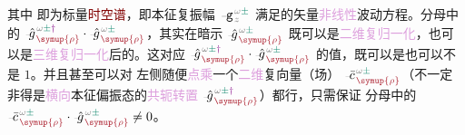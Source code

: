 其中  即为标量\textcolor{Maroon}{时空谱}，即\textcolor{PineGreen}{本征复振幅} $\Xint{\begin{smallmatrix} ~ \\ {}^{}_{\mathcolor{gray}{-}} \\ ~ \end{smallmatrix}}{09}{\mathtt{g}}^{\;\!\mathcolor{gray}{\omega} \textcolor{PineGreen}{\pm}}_{\;\! \mathcolor{gray}{z}}$ 满足的矢量\textcolor{Plum}{非线性}波动方程。分母中的 $\Xint{{}^{}_{\mathcolor{gray}{-}}}{10}{\hat{g}}^{\;\!\mathcolor{gray}{\omega} \textcolor{PineGreen}{\pm} \textcolor{Plum}{\dag}}_{\;\! \textcolor{Maroon}{\symup{\rho}}} \cdot \Xint{{}^{}_{\mathcolor{gray}{-}}}{10}{\hat{g}}^{\;\!\mathcolor{gray}{\omega} \textcolor{PineGreen}{\pm}}_{\;\! \textcolor{Maroon}{\symup{\rho}}}$，其实在暗示 $\Xint{{}^{}_{\mathcolor{gray}{-}}}{10}{\hat{g}}^{\;\!\mathcolor{gray}{\omega} \textcolor{PineGreen}{\pm}}_{\;\! \textcolor{Maroon}{\symup{\rho}}}$ 既可以是\textcolor{Plum}{二维复归一化}，也可以是\textcolor{Plum}{三维复归一化}后的。这对应 $\Xint{{}^{}_{\mathcolor{gray}{-}}}{10}{\hat{g}}^{\;\!\mathcolor{gray}{\omega} \textcolor{PineGreen}{\pm} \textcolor{Plum}{\dag}}_{\;\! \textcolor{Maroon}{\symup{\rho}}} \cdot \Xint{{}^{}_{\mathcolor{gray}{-}}}{10}{\hat{g}}^{\;\!\mathcolor{gray}{\omega} \textcolor{PineGreen}{\pm}}_{\;\! \textcolor{Maroon}{\symup{\rho}}}$ 的值，既可以是也可以不是 $1$。并且甚至可以对  左侧随便\textcolor{Plum}{点乘}一个\textcolor{Plum}{二维}复向量（场） $\Xint{{}^{}_{\mathcolor{gray}{-}}}{04}{\bar{c}}^{\;\!\mathcolor{gray}{\omega} \textcolor{PineGreen}{\pm}}_{\;\! \textcolor{Maroon}{\symup{\rho}}}$（不一定非得是\textcolor{Plum}{横向}\textcolor{PineGreen}{本征偏振态}的\textcolor{Plum}{共轭转置} $\Xint{{}^{}_{\mathcolor{gray}{-}}}{10}{\hat{g}}^{\;\!\mathcolor{gray}{\omega} \textcolor{PineGreen}{\pm} \textcolor{Plum}{\dag}}_{\;\! \textcolor{Maroon}{\symup{\rho}}}$）都行，只需保证  分母中的 $\Xint{{}^{}_{\mathcolor{gray}{-}}}{04}{\bar{c}}^{\;\!\mathcolor{gray}{\omega} \textcolor{PineGreen}{\pm}}_{\;\! \textcolor{Maroon}{\symup{\rho}}} \cdot \Xint{{}^{}_{\mathcolor{gray}{-}}}{10}{\hat{g}}^{\;\!\mathcolor{gray}{\omega} \textcolor{PineGreen}{\pm}}_{\;\! \textcolor{Maroon}{\symup{\rho}}} \neq 0$。

